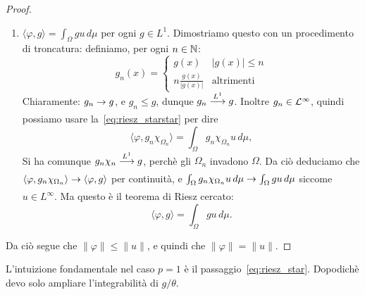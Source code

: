 \begin{proof}
\begin{enumerate}
		\item $\langle \varphi, g \rangle = \int_\Omega gu\,d\mu$ per ogni $g \in L^1$. Dimostriamo questo con un procedimento di troncatura: definiamo, per ogni $n \in \mathbb{N}$:
		\begin{equation*}
			g_n(x) = \begin{cases}
				g(x) & |g(x)| \leq n\\
				n \frac{g(x)}{|g(x)|} & \text{altrimenti}
			\end{cases}
		\end{equation*}
		Chiaramente: $g_n \underset{{}}{\rightarrow} g$, e $g_n \leq g$, dunque $g_n \overset{L^1}{\underset{{}}{\longrightarrow}} g$. Inoltre $g_n \in \mathcal{L}^\infty$, quindi possiamo usare la~\eqref{eq:riesz_starstar} per dire
		\begin{equation*}
			\langle \varphi, g_n \chi_{\Omega_n} \rangle = \int_\Omega g_n \chi_{\Omega_n} u \,d\mu,
		\end{equation*}
		Si ha comunque $g_n \chi_n \overset{L^1}{\underset{{}}{\longrightarrow}} g$, perchè gli $\Omega_n$ invadono $\Omega$. Da ciò deduciamo che $\langle \varphi, g_n \chi_{\Omega_n} \rangle \underset{{}}{\rightarrow} \langle \varphi, g \rangle$ per continuità, e $\int_\Omega  g_n \chi_{\Omega_n} u \,d\mu \underset{{}}{\rightarrow} \int_\Omega g u \,d\mu$ siccome $u \in L^\infty$. Ma questo è il teorema di Riesz cercato:
		\begin{equation*}
			\langle \varphi, g \rangle = \int_\Omega gu\,d\mu.
		\end{equation*}
	\end{enumerate}
	Da ciò segue che $\|\varphi\| \leq \|u\|$, e quindi che $\|\varphi\|=\|u\|$.
\end{proof}

\begin{remark}
	L'intuizione fondamentale nel caso $p=1$ è il passaggio~\eqref{eq:riesz_star}. Dopodichè devo solo ampliare l'integrabilità di $g/\theta$.
\end{remark}

